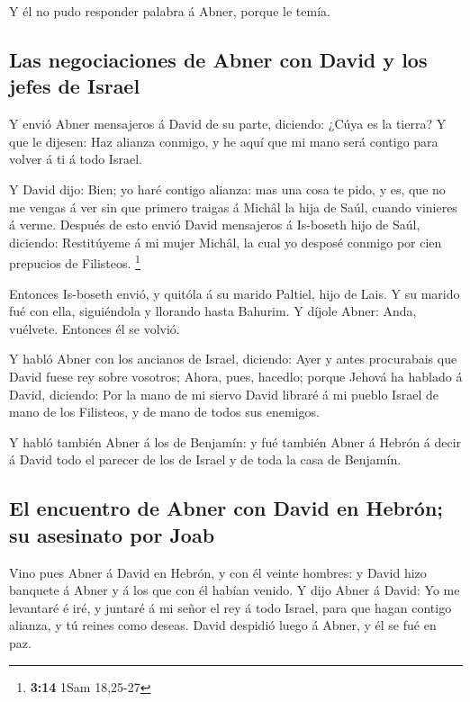  Y él no pudo responder palabra á Abner, porque le temía.

\hypertarget{las-negociaciones-de-abner-con-david-y-los-jefes-de-israel}{%
\subsection{Las negociaciones de Abner con David y los jefes de
Israel}\label{las-negociaciones-de-abner-con-david-y-los-jefes-de-israel}}

 Y envió Abner mensajeros á David de su parte, diciendo:
¿Cúya es la tierra? Y que le dijesen: Haz alianza conmigo, y he aquí que
mi mano será contigo para volver á ti á todo Israel.

 Y David dijo: Bien; yo haré contigo alianza: mas una cosa
te pido, y es, que no me vengas á ver sin que primero traigas á Michâl
la hija de Saúl, cuando vinieres á verme.  Después de esto
envió David mensajeros á Is-boseth hijo de Saúl, diciendo: Restitúyeme á
mi mujer Michâl, la cual yo desposé conmigo por cien prepucios de
Filisteos. \footnote{\textbf{3:14} 1Sam 18,25-27}

 Entonces Is-boseth envió, y quitóla á su marido Paltiel,
hijo de Lais.  Y su marido fué con ella, siguiéndola y
llorando hasta Bahurim. Y díjole Abner: Anda, vuélvete. Entonces él se
volvió.

 Y habló Abner con los ancianos de Israel, diciendo: Ayer y
antes procurabais que David fuese rey sobre vosotros; 
Ahora, pues, hacedlo; porque Jehová ha hablado á David, diciendo: Por la
mano de mi siervo David libraré á mi pueblo Israel de mano de los
Filisteos, y de mano de todos sus enemigos.

 Y habló también Abner á los de Benjamín: y fué también
Abner á Hebrón á decir á David todo el parecer de los de Israel y de
toda la casa de Benjamín.

\hypertarget{el-encuentro-de-abner-con-david-en-hebruxf3n-su-asesinato-por-joab}{%
\subsection{El encuentro de Abner con David en Hebrón; su asesinato por
Joab}\label{el-encuentro-de-abner-con-david-en-hebruxf3n-su-asesinato-por-joab}}

 Vino pues Abner á David en Hebrón, y con él veinte
hombres: y David hizo banquete á Abner y á los que con él habían venido.
 Y dijo Abner á David: Yo me levantaré é iré, y juntaré á
mi señor el rey á todo Israel, para que hagan contigo alianza, y tú
reines como deseas. David despidió luego á Abner, y él se fué en paz.

